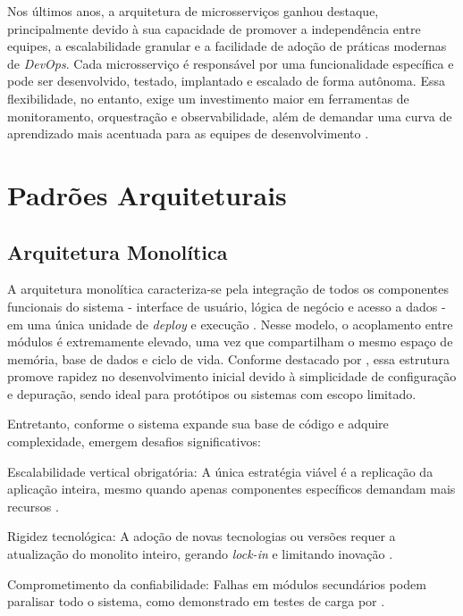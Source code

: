 Nos últimos anos, a arquitetura de microsserviços ganhou destaque, principalmente devido à sua capacidade de promover a independência entre equipes, a escalabilidade granular e a facilidade de adoção de práticas modernas de \textit{DevOps}. Cada microsserviço é responsável por uma funcionalidade específica e pode ser desenvolvido, testado, implantado e escalado de forma autônoma. Essa flexibilidade, no entanto, exige um investimento maior em ferramentas de monitoramento, orquestração e observabilidade, além de demandar uma curva de aprendizado mais acentuada para as equipes de desenvolvimento \cite{jamshidi2016systematic, shekhar2023microservices, nizami2020comparison}. 

\section{Padrões Arquiteturais}

\subsection{Arquitetura Monolítica}

A arquitetura monolítica caracteriza-se pela integração de todos os componentes funcionais do sistema - interface de usuário, lógica de negócio e acesso a dados - em uma única unidade de \textit{deploy} e execução \cite{nizami2020comparison}. Nesse modelo, o acoplamento entre módulos é extremamente elevado, uma vez que compartilham o mesmo espaço de memória, base de dados e ciclo de vida. Conforme destacado por \cite{farhan2023performance}, essa estrutura promove rapidez no desenvolvimento inicial devido à simplicidade de configuração e depuração, sendo ideal para protótipos ou sistemas com escopo limitado.

Entretanto, conforme o sistema expande sua base de código e adquire complexidade, emergem desafios significativos:

Escalabilidade vertical obrigatória: A única estratégia viável é a replicação da aplicação inteira, mesmo quando apenas componentes específicos demandam mais recursos \cite{nizami2020comparison}.

Rigidez tecnológica: A adoção de novas tecnologias ou versões requer a atualização do monolito inteiro, gerando \textit{lock-in} e limitando inovação \cite{jamshidi2016systematic}.

Comprometimento da confiabilidade: Falhas em módulos secundários podem paralisar todo o sistema, como demonstrado em testes de carga por \cite{farhan2023performance}.

